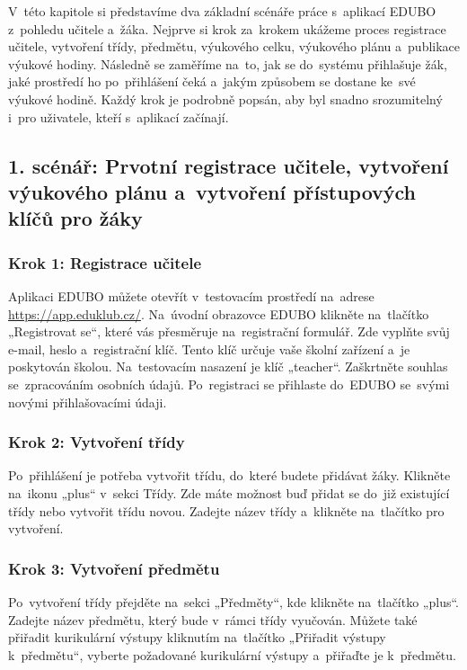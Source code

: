 \documentclass[male,czech,api_bc]{kitheses}
\begin{document}
V~této kapitole si představíme dva základní scénáře práce s~aplikací EDUBO z~pohledu učitele a~žáka. Nejprve si krok za~krokem ukážeme proces registrace učitele, vytvoření třídy, předmětu, výukového celku, výukového plánu a~publikace výukové hodiny. Následně se zaměříme na~to, jak se do~systému přihlašuje žák, jaké prostředí ho po~přihlášení čeká a~jakým způsobem se dostane ke~své výukové hodině. Každý krok je podrobně popsán, aby byl snadno srozumitelný i~pro uživatele, kteří s~aplikací začínají.

\subsection{1. scénář: Prvotní registrace učitele, vytvoření výukového plánu a~vytvoření přístupových klíčů pro žáky}

\subsubsection{Krok 1: Registrace učitele}
Aplikaci EDUBO můžete otevřít v~testovacím prostředí na~adrese \url{https://app.eduklub.cz/}. Na~úvodní obrazovce EDUBO klikněte na~tlačítko „Registrovat se“, které vás přesměruje na~registrační formulář. Zde vyplňte svůj e-mail, heslo a~registrační klíč. Tento klíč určuje vaše školní zařízení a~je poskytován školou. Na~testovacím nasazení je klíč „teacher“. Zaškrtněte souhlas se~zpracováním osobních údajů. Po~registraci se přihlaste do~EDUBO se~svými novými přihlašovacími údaji.

\subsubsection{Krok 2: Vytvoření třídy}
Po~přihlášení je potřeba vytvořit třídu, do~které budete přidávat žáky. Klikněte na~ikonu „plus“ v~sekci Třídy. Zde máte možnost buď přidat se do~již existující třídy nebo vytvořit třídu novou. Zadejte název třídy a~klikněte na~tlačítko pro vytvoření.

\subsubsection{Krok 3: Vytvoření předmětu}
Po~vytvoření třídy přejděte na~sekci „Předměty“, kde klikněte na~tlačítko „plus“. Zadejte název předmětu, který bude v~rámci třídy vyučován. Můžete také přiřadit kurikulární výstupy kliknutím na~tlačítko „Přiřadit výstupy k~předmětu“, vyberte požadované kurikulární výstupy a~přiřaďte je k~předmětu.
\end{document}
